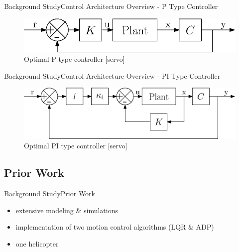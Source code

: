 \documentclass{beamer}
\begin{document}
\begin{frame}{Background Study}{Control Architecture Overview -  P Type Controller}
\begin{figure}
    \centering
    \includegraphics[width=.8\textwidth,keepaspectratio=true]{figs/ipe/P_Control}
    \caption{Optimal P type controller [servo]}
    \label{fig:P_Control}
\end{figure}
\end{frame}
\begin{frame}{Background Study}{Control Architecture Overview - PI Type Controller}
\begin{figure}
    \centering
    \includegraphics[width=.8\textwidth,keepaspectratio=true]{figs/ipe/PI_Control}
    \caption{Optimal PI type controller [servo]}
    \label{fig:PI_Control}
\end{figure}
\end{frame}

\subsection{Prior Work}

\begin{frame}{Background Study}{Prior Work}
  \begin{itemize}
      \item extensive modeling \& simulations
      \item implementation of two motion control algorithms (LQR \& ADP)
      \item one helicopter
  \end{itemize}
\end{frame}


\end{document}
